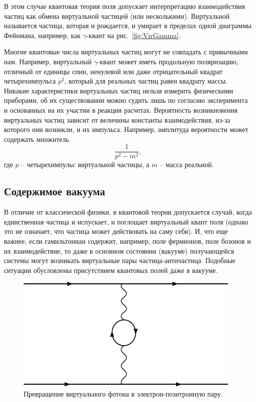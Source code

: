 \documentclass[a4paper, 12pt]{article}
\begin{document}
В этом случае квантовая теория поля допускает интерпретацию взаимодействия частиц как обмена виртуальной частицей (или несколькими). 
Виртуальной называется частица, которая и рождается, и умирает в пределах одной диаграммы Фейнмана, например, как $\gamma$-квант на рис.~\ref{fig:VirGamma}. 

Многие квантовые числа виртуальных частиц могут не совпадать с привычными нам. 
Например, виртуальный $\gamma$-квант может иметь продольную поляризацию, отличный от единицы спин, ненулевой или даже отрицательный квадрат четырехимпульса $p^2$, который для реальных частиц равен квадрату массы. 
Никакие характеристики виртуальных частиц нельзя измерить физическими приборами, об их существовании можно судить лишь по согласию эксперимента и основанных на их участии в реакции расчетах. 
Вероятность возникновения виртуальных частиц зависит от величины константы взаимодействия, из-за которого они возникли, и их импульса. 
Например, амплитуда вероятности может содержать множитель 
$$ \frac{1}{p^2 - m^2}, $$
где $p$ -- четырехимпульс виртуальной частицы, а $m$ -- масса реальной. 


\subsection{Содержимое вакуума}

В отличие от классической физики, в квантовой теории допускается случай, когда единственная частица и испускает, и поглощает виртуальный квант поля (однако это не означает, что частица может действовать на саму себя). 
И, что еще важнее, если гамильтониан содержит, например, поле фермионов, поле бозонов и их взаимодействие, то даже в основном состоянии (вакууме) получающейся системы могут возникать виртуальные пары частица-античастица. 
Подобные ситуации обусловлены присутствием квантовых полей даже в вакууме.

\begin{figure}[b]
\includegraphics[width=.45\linewidth]{figs/Gamma-ee}
\caption{Превращение виртуального фотона в электрон-позитронную пару.}
\label{fig:gamma-to-ee}
\end{figure}
\end{document}
